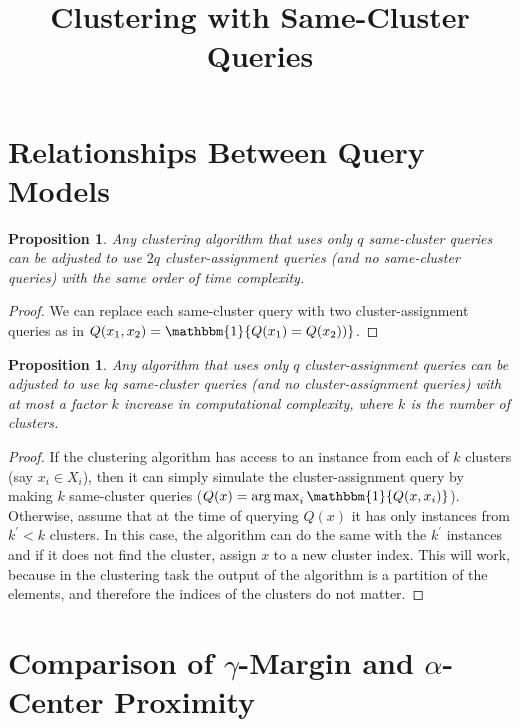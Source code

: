\documentclass{article}
\title{Clustering with Same-Cluster Queries}
\DeclareMathOperator*{\argmax}{arg\,max}
\newtheorem{proposition}[theorem]{Proposition}
\begin{document}
\maketitle

\appendix
\section{Relationships Between Query Models}
\label{appendix:diffQueryModels}

\begin{proposition}
Any clustering algorithm that uses only $q$ same-cluster queries can be adjusted to use $2q$ cluster-assignment queries (and no same-cluster queries) with the same order of time complexity.
\end{proposition}
\begin{proof}
We can replace each same-cluster query with two cluster-assignment queries as in $Q(x_1,x_2)={\mathbbm{1}}\{Q(x_1)=Q(x_2))\}$.
\end{proof}

\begin{proposition}
Any algorithm that uses only $q$ cluster-assignment queries can be adjusted to use $kq$ same-cluster queries (and no cluster-assignment queries) with at most a factor $k$ increase in computational complexity, where $k$ is the number of clusters.
\end{proposition}
\begin{proof}
If the clustering algorithm has access to an instance from each of $k$ clusters (say $x_i\in X_i$), then it can simply simulate the cluster-assignment query by making $k$ same-cluster queries ($Q(x) = \argmax_{i}\mathbbm{1}\{Q(x, x_i)\}$). Otherwise, assume that at the time of querying $Q(x)$ it has only instances from $k^\prime<k$ clusters. In this case, the algorithm can do the same with the $k^\prime$ instances and if it does not find the cluster, assign $x$ to a new cluster index. This will work, because in the clustering task the output of the algorithm is a partition of the elements, and therefore the indices of the clusters do not matter.
\end{proof}


\section{Comparison of $\gamma$-Margin and $\alpha$-Center Proximity}
\label{appendix:gammaMrginVsAlphaCenter}
\end{document}
